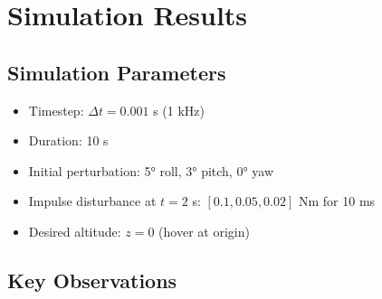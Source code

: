 \documentclass[12pt, a4paper]{article}
\begin{document}
\section{Simulation Results}
\label{sec:results}

\subsection{Simulation Parameters}

\begin{itemize}
    \item Timestep: $\Delta t = 0.001$ s (1 kHz)
    \item Duration: 10 s
    \item Initial perturbation: 5° roll, 3° pitch, 0° yaw
    \item Impulse disturbance at $t = 2$ s: $[0.1, 0.05, 0.02]$ Nm for 10 ms
    \item Desired altitude: $z = 0$ (hover at origin)
\end{itemize}

\subsection{Key Observations}
\end{document}
